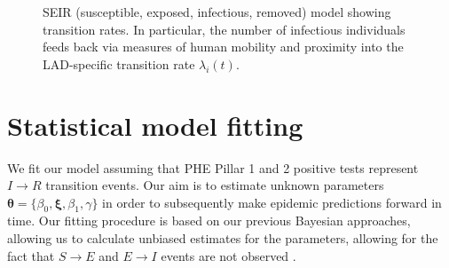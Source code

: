 \documentclass[a4paper]{article}
\begin{document}
\begin{figure} \centering                                                                                           
   \caption{SEIR (susceptible, exposed, infectious, removed) model showing transition
     rates.  In particular, the number of infectious individuals feeds back via measures
     of human mobility and proximity into the LAD-specific transition rate $\lambda_i(t)$.}                                                                                      
   \label{fig:stm-diagram}                                                                                           
 \end{figure}


\section{Statistical model fitting}
We fit our model assuming that PHE Pillar 1 and 2 positive tests represent $I\rightarrow
R$ transition events.  Our aim is to estimate unknown parameters $\bm{\theta} = \{ \beta_0, \bm{\xi},
\beta_1, \gamma \}$ in order to subsequently make epidemic predictions forward in time.
Our fitting procedure is based on our previous Bayesian approaches, allowing us to calculate unbiased estimates
for the parameters, allowing for the fact that $S\rightarrow E$ and $E \rightarrow I$
events are not observed \citep{JewEtAl2009b}.
\end{document}
